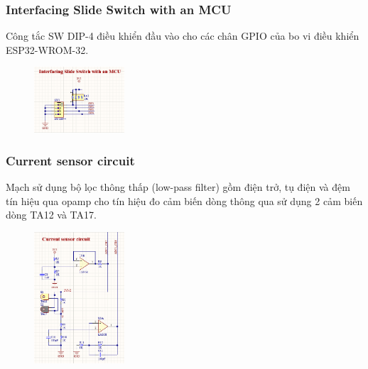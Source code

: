 \subsubsection{Interfacing Slide Switch with an MCU}
\label{subsec: Interfacing Slide Switch with an MCU}

Công tắc SW DIP-4 điều khiển đầu vào cho các chân GPIO của bo vi điều khiển ESP32-WROM-32.

\begin{figure}[!htbp]
    \centering
    \includegraphics[width=0.3\textwidth]{graphics/section3/f3.PNG}
\end{figure}
\FloatBarrier

\subsubsection{Current sensor circuit}
\label{subsec:Current sensor circuit}

Mạch sử dụng bộ lọc thông thấp (low-pass filter) gồm điện trở, tụ điện và đệm tín hiệu qua opamp cho tín hiệu đo cảm biến dòng thông qua sử dụng 2 cảm biến dòng TA12 và TA17.
\begin{figure}[!htbp]
    \centering
    \includegraphics[width=0.3\textwidth]{graphics/section3/f4.PNG}
\end{figure}
\FloatBarrier

